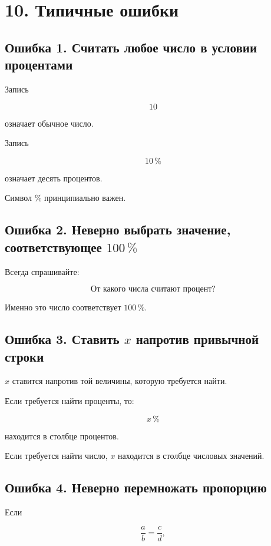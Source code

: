 \documentclass[a4paper,12pt]{article}
\newcommand{\pct}[1]{#1\,\%}
\begin{document}

\section*{\textcolor{darkaccent}{10. Типичные ошибки}}

\subsection*{Ошибка 1. Считать любое число в условии процентами}

Запись

\[
10
\]

означает обычное число.

Запись

\[
\pct{10}
\]

означает десять процентов.

Символ \(\%\) принципиально важен.

\subsection*{Ошибка 2. Неверно выбрать значение, соответствующее \(\pct{100}\)}

Всегда спрашивайте:

\[
\boxed{\text{От какого числа считают процент?}}
\]

Именно это число соответствует \(\pct{100}\).

\subsection*{Ошибка 3. Ставить \(x\) напротив привычной строки}

\(x\) ставится напротив той величины, которую требуется найти.

Если требуется найти проценты, то:

\[
x\,\%
\]

находится в столбце процентов.

Если требуется найти число, \(x\) находится в столбце числовых значений.

\subsection*{Ошибка 4. Неверно перемножать пропорцию}

Если

\[
\frac{a}{b}=\frac{c}{d},
\]
\end{document}
